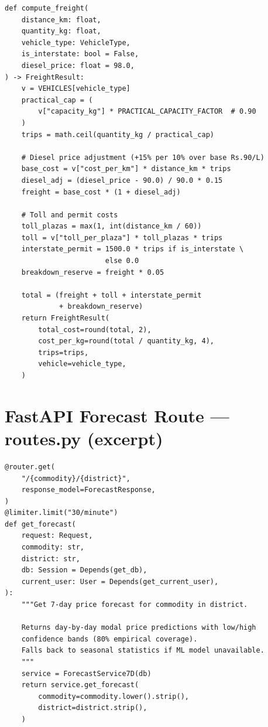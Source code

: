 \documentclass[12pt,a4paper]{report}
\begin{document}
\begin{lstlisting}[caption={Diesel-adjusted freight cost computation}]
def compute_freight(
    distance_km: float,
    quantity_kg: float,
    vehicle_type: VehicleType,
    is_interstate: bool = False,
    diesel_price: float = 98.0,
) -> FreightResult:
    v = VEHICLES[vehicle_type]
    practical_cap = (
        v["capacity_kg"] * PRACTICAL_CAPACITY_FACTOR  # 0.90
    )
    trips = math.ceil(quantity_kg / practical_cap)

    # Diesel price adjustment (+15% per 10% over base Rs.90/L)
    base_cost = v["cost_per_km"] * distance_km * trips
    diesel_adj = (diesel_price - 90.0) / 90.0 * 0.15
    freight = base_cost * (1 + diesel_adj)

    # Toll and permit costs
    toll_plazas = max(1, int(distance_km / 60))
    toll = v["toll_per_plaza"] * toll_plazas * trips
    interstate_permit = 1500.0 * trips if is_interstate \
                        else 0.0
    breakdown_reserve = freight * 0.05

    total = (freight + toll + interstate_permit
             + breakdown_reserve)
    return FreightResult(
        total_cost=round(total, 2),
        cost_per_kg=round(total / quantity_kg, 4),
        trips=trips,
        vehicle=vehicle_type,
    )
\end{lstlisting}

\section{FastAPI Forecast Route --- routes.py (excerpt)}

\begin{lstlisting}[caption={7-day price forecast REST endpoint}]
@router.get(
    "/{commodity}/{district}",
    response_model=ForecastResponse,
)
@limiter.limit("30/minute")
def get_forecast(
    request: Request,
    commodity: str,
    district: str,
    db: Session = Depends(get_db),
    current_user: User = Depends(get_current_user),
):
    """Get 7-day price forecast for commodity in district.

    Returns day-by-day modal price predictions with low/high
    confidence bands (80% empirical coverage).
    Falls back to seasonal statistics if ML model unavailable.
    """
    service = ForecastService7D(db)
    return service.get_forecast(
        commodity=commodity.lower().strip(),
        district=district.strip(),
    )
\end{lstlisting}

\end{document}
